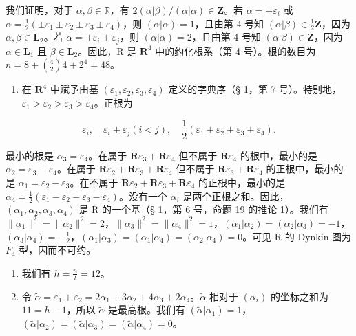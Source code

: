 我们证明，对于 \(\alpha, \beta \in \mathbb{R}\)，有 \(2(\alpha|\beta) / (\alpha|\alpha) \in \mathbf{Z}\)。若 \(\alpha = \pm \varepsilon_i\) 或 \(\alpha = \frac{1}{2} (\pm \varepsilon_1 \pm \varepsilon_2 \pm \varepsilon_3 \pm \varepsilon_4)\)，则 \((\alpha|\alpha) = 1\)，且由第 4 号知 \((\alpha|\beta) \in \frac{1}{2}\mathbf{Z}\)，因为 \(\alpha, \beta \in \mathbf{L}_2\)。若 \(\alpha = \pm \varepsilon_i \pm \varepsilon_j\)，则 \((\alpha|\alpha) = 2\)，且由第 4 号知 \((\alpha|\beta) \in \mathbf{Z}\)，因为 \(\alpha \in \mathbf{L}_1\) 且 \(\beta \in \mathbf{L}_2\)。因此，R 是 \(\mathbf{R}^4\) 中的约化根系（第 4 号）。根的数目为 \(n = 8 + \binom{4}{2} 4 + 2^4 = 48\)。

\begin{enumerate}
\def\labelenumi{(\Roman{enumi})}
\setcounter{enumi}{1}
\tightlist
\item
  在 \(\mathbf{R}^4\) 中赋予由基 \((\varepsilon_1, \varepsilon_2, \varepsilon_3, \varepsilon_4)\) 定义的字典序（§ 1，第 7 号）。特别地，\(\varepsilon_1 > \varepsilon_2 > \varepsilon_3 > \varepsilon_4\)。正根为
\end{enumerate}

\[
\varepsilon_ {i}, \quad \varepsilon_ {i} \pm \varepsilon_ {j} (i <   j), \quad \frac {1}{2} (\varepsilon_ {1} \pm \varepsilon_ {2} \pm \varepsilon_ {3} \pm \varepsilon_ {4}).
\]

最小的根是 \(\alpha_{3} = \varepsilon_{4}\)。在属于 \(\mathbf{R}\varepsilon_{3} + \mathbf{R}\varepsilon_{4}\) 但不属于 \(\mathbf{R}\varepsilon_{4}\) 的根中，最小的是 \(\alpha_{2} = \varepsilon_{3} - \varepsilon_{4}\)。在属于 \(\mathbf{R}\varepsilon_{2} + \mathbf{R}\varepsilon_{3} + \mathbf{R}\varepsilon_{4}\) 但不属于 \(\mathbf{R}\varepsilon_{3} + \mathbf{R}\varepsilon_{4}\) 的正根中，最小的是 \(\alpha_{1} = \varepsilon_{2} - \varepsilon_{3}\)。在不属于 \(\mathbf{R}\varepsilon_{2} + \mathbf{R}\varepsilon_{3} + \mathbf{R}\varepsilon_{4}\) 的正根中，最小的是 \(\alpha_{4} = \frac{1}{2} (\varepsilon_{1} - \varepsilon_{2} - \varepsilon_{3} - \varepsilon_{4})\)。没有一个 \(\alpha_{i}\) 是两个正根之和。因此，\((\alpha_{1},\alpha_{2},\alpha_{3},\alpha_{4})\) 是 R 的一个基（§ 1，第 6 号，命题 19 的推论 1）。我们有 \(\| \alpha_1 \|^2 = \| \alpha_2 \|^2 = 2\)，\(\| \alpha_3 \|^2 = \| \alpha_4 \|^2 = 1\)，\((\alpha_1|\alpha_2) = (\alpha_2|\alpha_3) = -1\)，\((\alpha_3|\alpha_4) = -\frac{1}{2}\)，\((\alpha_1|\alpha_3) = (\alpha_1|\alpha_4) = (\alpha_2|\alpha_4) = 0\)。可见 R 的 Dynkin 图为 \(F_4\) 型，因而不可约。

\begin{enumerate}
\def\labelenumi{(\Roman{enumi})}
\setcounter{enumi}{2}
\item
  我们有 \(h = \frac{n}{l} = 12\)。
\item
  令 \(\tilde{\alpha} = \varepsilon_1 + \varepsilon_2 = 2\alpha_1 + 3\alpha_2 + 4\alpha_3 + 2\alpha_4\)。\(\tilde{\alpha}\) 相对于 \((\alpha_i)\) 的坐标之和为 \(11 = h - 1\)，所以 \(\tilde{\alpha}\) 是最高根。我们有 \((\tilde{\alpha}|\alpha_1) = 1\)，\((\tilde{\alpha}|\alpha_2) = (\tilde{\alpha}|\alpha_3) = (\tilde{\alpha}|\alpha_4) = 0\)。
\end{enumerate}

